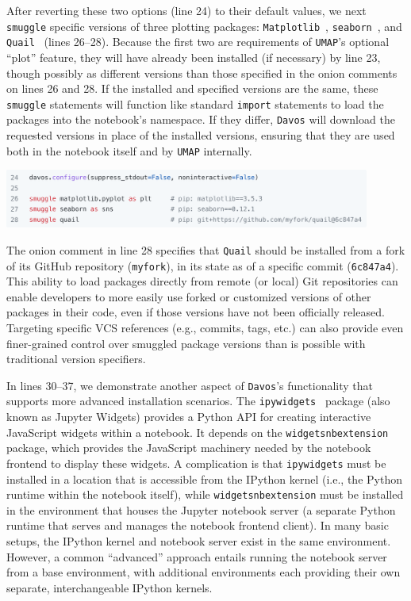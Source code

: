 \documentclass[preprint,12pt,a4paper]{elsarticle}
\begin{document}
After reverting these two options (line 24) to their default values, we next \texttt{smuggle}
specific versions of three plotting packages:
\texttt{Matplotlib}~\cite{Hunt07}, \texttt{seaborn}~\cite{Wask21}, and
\texttt{Quail}~\cite{HeusEtal17} (lines 26--28). Because the first two
are requirements of \texttt{UMAP}'s optional ``plot'' feature, they
will have already been installed (if necessary) by line 23, though possibly as
different versions than those specified in the onion comments on lines
26 and 28. If the installed and specified versions are the same, these
\texttt{smuggle} statements will function like standard \texttt{import}
statements to load the packages into the notebook's namespace. If they
differ, \texttt{Davos} will download the requested versions in place
of the installed versions, ensuring that they are used both in the notebook itself and by \texttt{UMAP} internally.
\begin{center}
\includegraphics[width=0.9\textwidth]{figs/example6}
\end{center}
The onion comment in line 28 specifies that \texttt{Quail} should be
installed from a fork of its GitHub repository (\texttt{myfork}), in its state as of a specific commit (\texttt{6c847a4}).
This ability to load packages directly from remote (or local) Git repositories can
enable developers to more easily use forked or customized versions of other
packages in their code, even if those versions have not been
officially released. Targeting specific VCS references (e.g., commits, tags, etc.) can also provide even finer-grained control over smuggled package versions than is possible with traditional version specifiers.

In lines 30--37, we demonstrate another aspect of \texttt{Davos}'s functionality that supports more advanced installation scenarios.
The \texttt{ipywidgets}~\cite{FredEtal15} package (also known as Jupyter Widgets) provides a Python API for creating interactive JavaScript widgets within a notebook.
It depends on the \texttt{widgetsnbextension} package, which provides the JavaScript machinery needed by the notebook frontend to display these widgets.
A complication is that \texttt{ipywidgets} must be installed in a location that is accessible from the IPython kernel (i.e., the Python runtime within the notebook itself), while \texttt{widgetsnbextension} must be installed in the environment that houses the Jupyter notebook server (a separate Python runtime that serves and manages the notebook frontend client).
In many basic setups, the IPython kernel and notebook server exist in the same environment.
However, a common ``advanced'' approach entails running the notebook server from a base environment, with additional environments each providing their own separate, interchangeable IPython kernels.
\end{document}
